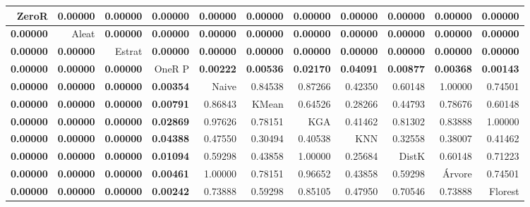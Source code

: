 \begin{table}
\centering
\label{Iristeste_pareado_table}
\begin{tabular}{rrrrrrrrrrr}
\toprule
         ZeroR & \textbf{0.00000} & \textbf{0.00000} & \textbf{0.00000} & \textbf{0.00000} & \textbf{0.00000} & \textbf{0.00000} & \textbf{0.00000} & \textbf{0.00000} & \textbf{0.00000} & \textbf{0.00000} \\ \hline
\textbf{0.00000} &            Aleat & \textbf{0.00000} & \textbf{0.00000} & \textbf{0.00000} & \textbf{0.00000} & \textbf{0.00000} & \textbf{0.00000} & \textbf{0.00000} & \textbf{0.00000} & \textbf{0.00000} \\ \hline
\textbf{0.00000} & \textbf{0.00000} &          Estrat & \textbf{0.00000} & \textbf{0.00000} & \textbf{0.00000} & \textbf{0.00000} & \textbf{0.00000} & \textbf{0.00000} & \textbf{0.00000} & \textbf{0.00000} \\ \hline
\textbf{0.00000} & \textbf{0.00000} & \textbf{0.00000} &          OneR P & \textbf{0.00222} & \textbf{0.00536} & \textbf{0.02170} & \textbf{0.04091} & \textbf{0.00877} & \textbf{0.00368} & \textbf{0.00143} \\ \hline
\textbf{0.00000} & \textbf{0.00000} & \textbf{0.00000} & \textbf{0.00354} &          Naive &          0.84538 &          0.87266 &          0.42350 &          0.60148 &          1.00000 &          0.74501 \\ \hline
\textbf{0.00000} & \textbf{0.00000} & \textbf{0.00000} & \textbf{0.00791} &          0.86843 &          KMean &          0.64526 &          0.28266 &          0.44793 &          0.78676 &          0.60148 \\ \hline
\textbf{0.00000} & \textbf{0.00000} & \textbf{0.00000} & \textbf{0.02869} &          0.97626 &          0.78151 &          KGA &          0.41462 &          0.81302 &          0.83888 &          1.00000 \\ \hline
\textbf{0.00000} & \textbf{0.00000} & \textbf{0.00000} & \textbf{0.04388} &          0.47550 &          0.30494 &          0.40538 &          KNN &          0.32558 &          0.38007 &          0.41462 \\ \hline
\textbf{0.00000} & \textbf{0.00000} & \textbf{0.00000} & \textbf{0.01094} &          0.59298 &          0.43858 &          1.00000 &          0.25684 &          DistK &          0.60148 &          0.71223 \\ \hline
\textbf{0.00000} & \textbf{0.00000} & \textbf{0.00000} & \textbf{0.00461} &          1.00000 &          0.78151 &          0.96652 &          0.43858 &          0.59298 &          Árvore &          0.74501 \\ \hline
\textbf{0.00000} & \textbf{0.00000} & \textbf{0.00000} & \textbf{0.00242} &          0.73888 &          0.59298 &          0.85105 &          0.47950 &          0.70546 &          0.73888 &          Florest \\ \hline
\bottomrule
\end{tabular}
\end{table}
